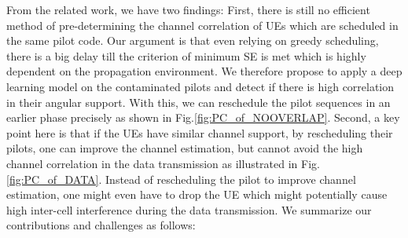 From the related work, we have two findings: First, there is still no efficient method of pre-determining the channel correlation of UEs which are scheduled in the same pilot code. Our argument is that even relying on greedy scheduling, there is a big delay till the criterion of minimum SE is met which is highly dependent on the propagation environment. 
We therefore propose to apply a deep learning model on the contaminated pilots and detect if there is high correlation in their angular support. With this, we can reschedule the pilot sequences in an earlier phase precisely as shown in Fig.\ref{fig:PC_of_NOOVERLAP}. Second, a key point here is that if the UEs have similar channel support, by rescheduling their pilots, one can improve the channel estimation, but cannot avoid the high channel correlation in the data transmission as illustrated in Fig. \ref{fig:PC_of_DATA}. Instead of rescheduling the pilot to improve channel estimation, one might even have to drop the UE which might potentially cause high inter-cell interference during the data transmission.  %
We summarize our contributions and challenges as follows:
